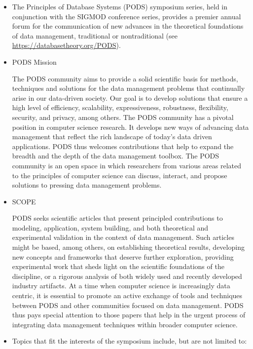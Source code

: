 \documentclass[prodmode,acmtecs]{acmsmall} %
\begin{document}
\begin{itemize}\item  The Principles of Database Systems (PODS) symposium series, held in conjunction with the SIGMOD conference series, provides a premier annual forum for the communication of new advances in the theoretical foundations of data management, traditional or nontraditional (see \href{https://databasetheory.org/PODS}{https://databasetheory.org/PODS}). 
 
\item  PODS Mission 
 
  The PODS community aims to provide a solid scientific basis for methods, techniques and solutions for the data management problems that continually arise in our data-driven society. Our goal is to develop solutions that ensure a high level of efficiency, scalability, expressiveness, robustness, flexibility, security, and privacy, among others. The PODS community has a pivotal position in computer science research. It develops new ways of advancing data management that reflect the rich landscape of today’s data driven applications. PODS thus welcomes contributions that help to expand the breadth and the depth of the data management toolbox. The PODS community is an open space in which researchers from various areas related to the principles of computer science can discuss, interact, and propose solutions to pressing data management problems.  
 
\item  SCOPE 
 
  PODS seeks scientific articles that present principled contributions to modeling, application, system building, and both theoretical and experimental validation in the context of data management. Such articles might be based, among others, on establishing theoretical results, developing new concepts and frameworks that deserve further exploration, providing experimental work that sheds light on the scientific foundations of the discipline, or a rigorous analysis of both widely used and recently developed industry artifacts. At a time when computer science is increasingly data centric, it is essential to promote an active exchange of tools and techniques between PODS and other communities focused on data management. PODS thus pays special attention to those papers that help in the urgent process of integrating data management techniques within broader computer science. 
 
\item  Topics that fit the interests of the symposium include, but are not limited to: 
 

\end{itemize}
\end{document}
